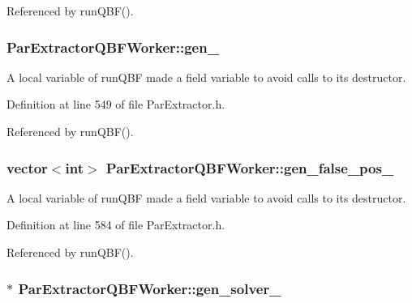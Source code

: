 Referenced by run\-Q\-B\-F().

\hypertarget{classParExtractorQBFWorker_adf9fdc0ec3d272476e6a290fbf3c3b6b}{
\subsubsection[{gen\-\_\-}]{ Par\-Extractor\-Q\-B\-F\-Worker\-::gen\-\_\-\hspace{0.3cm}{\ttfamily [protected]}}}\label{classParExtractorQBFWorker_adf9fdc0ec3d272476e6a290fbf3c3b6b}


A local variable of run\-Q\-B\-F made a field variable to avoid calls to its destructor. 



Definition at line 549 of file Par\-Extractor.\-h.



Referenced by run\-Q\-B\-F().

\hypertarget{classParExtractorQBFWorker_a324449464ae04fc7bef80cdd1ed9640f}{
\subsubsection[{gen\-\_\-false\-\_\-pos\-\_\-}]{\setlength{\rightskip}{0pt plus 5cm}vector$<$int$>$ Par\-Extractor\-Q\-B\-F\-Worker\-::gen\-\_\-false\-\_\-pos\-\_\-\hspace{0.3cm}{\ttfamily [protected]}}}\label{classParExtractorQBFWorker_a324449464ae04fc7bef80cdd1ed9640f}


A local variable of run\-Q\-B\-F made a field variable to avoid calls to its destructor. 



Definition at line 584 of file Par\-Extractor.\-h.



Referenced by run\-Q\-B\-F().

\hypertarget{classParExtractorQBFWorker_a8e1ba62520402318260a1a0fa4aff522}{
\subsubsection[{gen\-\_\-solver\-\_\-}]{$\ast$ Par\-Extractor\-Q\-B\-F\-Worker\-::gen\-\_\-solver\-\_\-\hspace{0.3cm}{\ttfamily [protected]}}}\label{classParExtractorQBFWorker_a8e1ba62520402318260a1a0fa4aff522}


